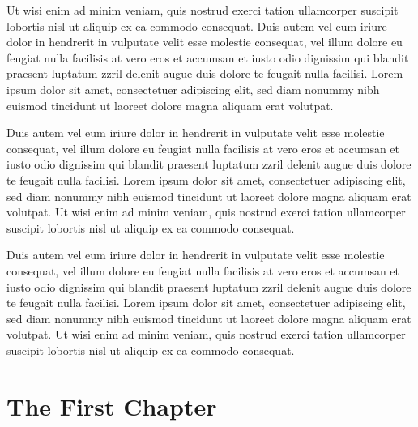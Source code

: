 \documentclass[oldfontcommands,6x9]{pupbook}
\begin{document}
\begin{thepreface}
Ut wisi enim ad minim veniam, quis nostrud exerci tation ullamcorper
suscipit lobortis nisl ut aliquip ex ea commodo consequat. Duis autem
vel eum iriure dolor in hendrerit in vulputate velit esse molestie
consequat, vel illum dolore eu feugiat nulla facilisis at vero eros et
accumsan et iusto odio dignissim qui blandit praesent luptatum zzril
delenit augue duis dolore te feugait nulla facilisi. Lorem ipsum dolor
sit amet, consectetuer adipiscing elit, sed diam nonummy nibh euismod
tincidunt ut laoreet dolore magna aliquam erat volutpat. 

Duis autem vel eum iriure dolor in hendrerit in vulputate velit esse
molestie consequat, vel illum dolore eu feugiat nulla facilisis at vero
eros et accumsan et iusto odio dignissim qui blandit praesent luptatum
zzril delenit augue duis dolore te feugait nulla facilisi. Lorem ipsum
dolor sit amet, consectetuer adipiscing elit, sed diam nonummy nibh
euismod tincidunt ut laoreet dolore magna aliquam erat volutpat. Ut wisi
enim ad minim veniam, quis nostrud exerci tation ullamcorper suscipit
lobortis nisl ut aliquip ex ea commodo consequat. 

\pagebreak
\thispagestyle{chapter}
Duis autem vel eum iriure dolor in hendrerit in vulputate velit esse
molestie consequat, vel illum dolore eu feugiat nulla facilisis at vero
eros et accumsan et iusto odio dignissim qui blandit praesent luptatum
zzril delenit augue duis dolore te feugait nulla facilisi. Lorem ipsum
dolor sit amet, consectetuer adipiscing elit, sed diam nonummy nibh
euismod tincidunt ut laoreet dolore magna aliquam erat volutpat. Ut wisi
enim ad minim veniam, quis nostrud exerci tation ullamcorper suscipit
lobortis nisl ut aliquip ex ea commodo consequat. 

\end{thepreface}


\mainmatter

\chapter{The First Chapter}\label{testone}
\end{document}
